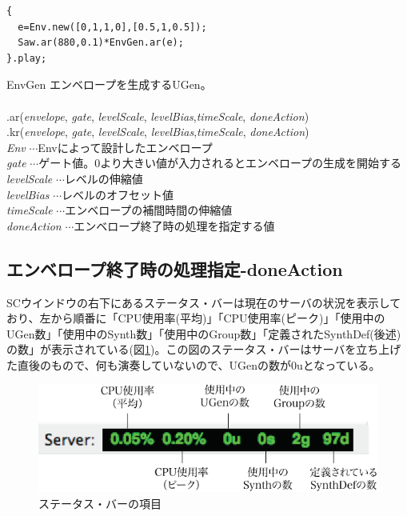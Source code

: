 \documentclass{jsarticle}
\begin{document}
\begin{lstlisting}[caption=エンベロープの適用,label=code:apply]
{
  e=Env.new([0,1,1,0],[0.5,1,0.5]);
  Saw.ar(880,0.1)*EnvGen.ar(e);
}.play;
\end{lstlisting}

\begin{itembox}[l]{EnvGen}
{\footnotesize 
エンベロープを生成するUGen。\\\\
.ar({\it envelope}, {\it gate}, {\it levelScale}, {\it levelBias},{\it timeScale}, {\it doneAction})\\
.kr({\it envelope}, {\it gate}, {\it levelScale}, {\it levelBias},{\it timeScale}, {\it doneAction})\\

{\it Env} $\cdots$Envによって設計したエンベロープ\\
{\it gate} $\cdots$ゲート値。0より大きい値が入力されるとエンベロープの生成を開始する\\
{\it levelScale} $\cdots$レベルの伸縮値\\
{\it levelBias} $\cdots$レベルのオフセット値\\
{\it timeScale} $\cdots$エンベロープの補間時間の伸縮値\\
{\it doneAction} $\cdots$エンベロープ終了時の処理を指定する値\\
}
\end{itembox}

\subsection{エンベロープ終了時の処理指定-doneAction}
SCウインドウの右下にあるステータス・バーは現在のサーバの状況を表示しており、左から順番に「CPU使用率(平均)」「CPU使用率(ピーク)」「使用中のUGen数」「使用中のSynth数」「使用中のGroup数」「定義されたSynthDef(後述)の数」が表示されている(図\ref{fig:booted})。この図のステータス・バーはサーバを立ち上げた直後のもので、何も演奏していないので、UGenの数が0uとなっている。

\begin{figure}[htbp]
 \begin{center}
  \includegraphics[scale=0.8]{booted_comment.pdf}
 \end{center}
 \caption{ステータス・バーの項目}
 \label{fig:booted}
\end{figure}
\end{document}
